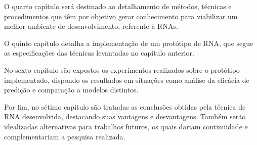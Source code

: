 O quarto capítulo será destinado ao detalhamento de métodos, técnicas e procedimentos que têm por objetivo gerar conhecimento para viabilizar um melhor ambiente de desenvolvimento, referente à RNAs.

O quinto capítulo detalha a implementação de um protótipo de RNA, que segue as especificações das técnicas levantadas no capítulo anterior.

No sexto capítulo são expostos os experimentos realizados sobre o protótipo implementado, dispondo os resultados em situações como análise da eficácia de predição e comparação a modelos distintos.

Por fim, no sétimo capítulo são tratadas as conclusões obtidas pela técnica de RNA desenvolvida, destacando suas vantagens e desvantagens. Também serão idealizadas alternativas para trabalhos futuros, os quais dariam continuidade e complementariam a pesquisa realizada.



